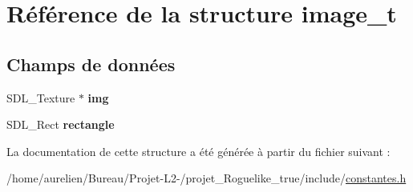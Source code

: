 \hypertarget{structimage__t}{}\section{Référence de la structure image\+\_\+t}
\label{structimage__t}
\subsection*{Champs de données}
\begin{DoxyCompactItemize}
\item 
\mbox{\label{structimage__t_aa61e957150bc0bf8b0147ec8caa1ecb0}} 
S\+D\+L\+\_\+\+Texture $\ast$ {\bfseries img}
\item 
\mbox{\label{structimage__t_abcb7f48a4050ae247aecbc34598b3cd8}} 
S\+D\+L\+\_\+\+Rect {\bfseries rectangle}
\end{DoxyCompactItemize}


La documentation de cette structure a été générée à partir du fichier suivant \+:\begin{DoxyCompactItemize}
\item 
/home/aurelien/\+Bureau/\+Projet-\/\+L2-\//projet\+\_\+\+Roguelike\+\_\+true/include/\hyperlink{constantes_8h}{constantes.\+h}\end{DoxyCompactItemize}
